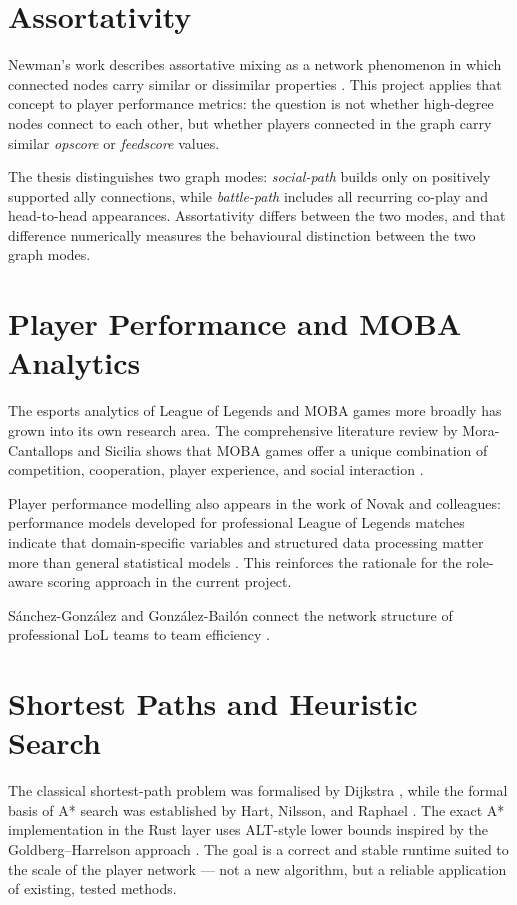 \section{Assortativity}

Newman's work describes assortative mixing as a network phenomenon in which connected nodes carry similar or dissimilar properties \cite{newman2003}. This project applies that concept to player performance metrics: the question is not whether high-degree nodes connect to each other, but whether players connected in the graph carry similar \textit{opscore} or \textit{feedscore} values.

The thesis distinguishes two graph modes: \textit{social-path} builds only on positively supported ally connections, while \textit{battle-path} includes all recurring co-play and head-to-head appearances. Assortativity differs between the two modes, and that difference numerically measures the behavioural distinction between the two graph modes.

\section{Player Performance and MOBA Analytics}

The esports analytics of League of Legends and MOBA games more broadly has grown into its own research area. The comprehensive literature review by Mora-Cantallops and Sicilia shows that MOBA games offer a unique combination of competition, cooperation, player experience, and social interaction \cite{moracantallops2019}.

Player performance modelling also appears in the work of Novak and colleagues: performance models developed for professional League of Legends matches indicate that domain-specific variables and structured data processing matter more than general statistical models \cite{novak2022}. This reinforces the rationale for the role-aware scoring approach in the current project.

Sánchez-González and González-Bailón connect the network structure of professional LoL teams to team efficiency \cite{sanchezgonzalezBailon2023}.

\section{Shortest Paths and Heuristic Search}

The classical shortest-path problem was formalised by Dijkstra \cite{dijkstra1959}, while the formal basis of A* search was established by Hart, Nilsson, and Raphael \cite{hart1968}. The exact A* implementation in the Rust layer uses ALT-style lower bounds inspired by the Goldberg--Harrelson approach \cite{goldberg2005}. The goal is a correct and stable runtime suited to the scale of the player network --- not a new algorithm, but a reliable application of existing, tested methods.

